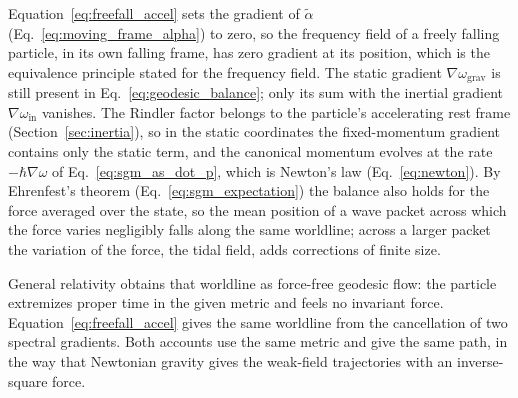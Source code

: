 \documentclass[aps,prd,onecolumn,tightenlines,nofootinbib,notitlepage,11pt,floatfix]{revtex4-2}
\theoremstyle{indentedtheorem}
\begin{document}
Equation~\eqref{eq:freefall_accel} sets the gradient of $\tilde{\alpha}$ (Eq.~\eqref{eq:moving_frame_alpha}) to zero, so the frequency field of a freely falling particle, in its own falling frame, has zero gradient at its position, which is the equivalence principle stated for the frequency field. The static gradient $\nabla\omega_\text{grav}$ is still present in Eq.~\eqref{eq:geodesic_balance}; only its sum with the inertial gradient $\nabla\omega_\text{in}$ vanishes. The Rindler factor belongs to the particle's accelerating rest frame (Section~\ref{sec:inertia}), so in the static coordinates the fixed-momentum gradient contains only the static term, and the canonical momentum evolves at the rate $-\hbar\nabla\omega$ of Eq.~\eqref{eq:sgm_as_dot_p}, which is Newton's law (Eq.~\eqref{eq:newton}). By Ehrenfest's theorem (Eq.~\eqref{eq:sgm_expectation}) the balance also holds for the force averaged over the state, so the mean position of a wave packet across which the force varies negligibly falls along the same worldline; across a larger packet the variation of the force, the tidal field, adds corrections of finite size.

General relativity obtains that worldline as force-free geodesic flow: the particle extremizes proper time in the given metric and feels no invariant force. Equation~\eqref{eq:freefall_accel} gives the same worldline from the cancellation of two spectral gradients. Both accounts use the same metric and give the same path, in the way that Newtonian gravity gives the weak-field trajectories with an inverse-square force.
\end{document}

